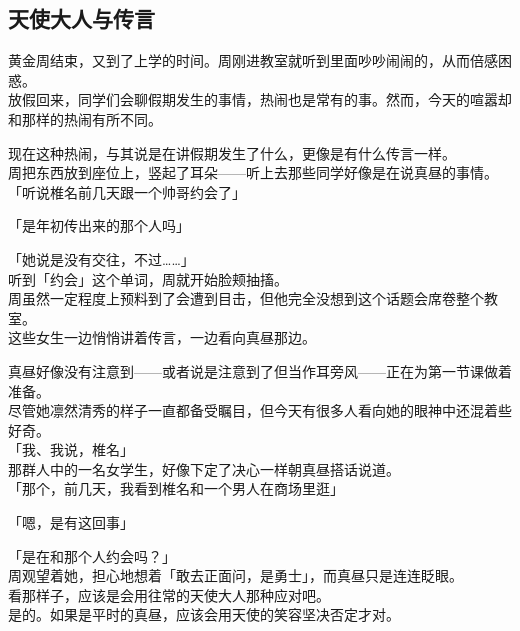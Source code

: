\subsection{天使大人与传言}

黄金周结束，又到了上学的时间。周刚进教室就听到里面吵吵闹闹的，从而倍感困惑。\\

放假回来，同学们会聊假期发生的事情，热闹也是常有的事。然而，今天的喧嚣却和那样的热闹有所不同。

现在这种热闹，与其说是在讲假期发生了什么，更像是有什么传言一样。\\

周把东西放到座位上，竖起了耳朵——听上去那些同学好像是在说真昼的事情。\\

「听说椎名前几天跟一个帅哥约会了」

「是年初传出来的那个人吗」

「她说是没有交往，不过……」\\

听到「约会」这个单词，周就开始脸颊抽搐。\\

周虽然一定程度上预料到了会遭到目击，但他完全没想到这个话题会席卷整个教室。\\

这些女生一边悄悄讲着传言，一边看向真昼那边。

真昼好像没有注意到——或者说是注意到了但当作耳旁风——正在为第一节课做着准备。\\

尽管她凛然清秀的样子一直都备受瞩目，但今天有很多人看向她的眼神中还混着些好奇。\\

「我、我说，椎名」\\

那群人中的一名女学生，好像下定了决心一样朝真昼搭话说道。\\

「那个，前几天，我看到椎名和一个男人在商场里逛」

「嗯，是有这回事」

「是在和那个人约会吗？」\\

周观望着她，担心地想着「敢去正面问，是勇士」，而真昼只是连连眨眼。\\

看那样子，应该是会用往常的天使大人那种应对吧。\\

是的。如果是平时的真昼，应该会用天使的笑容坚决否定才对。\\

